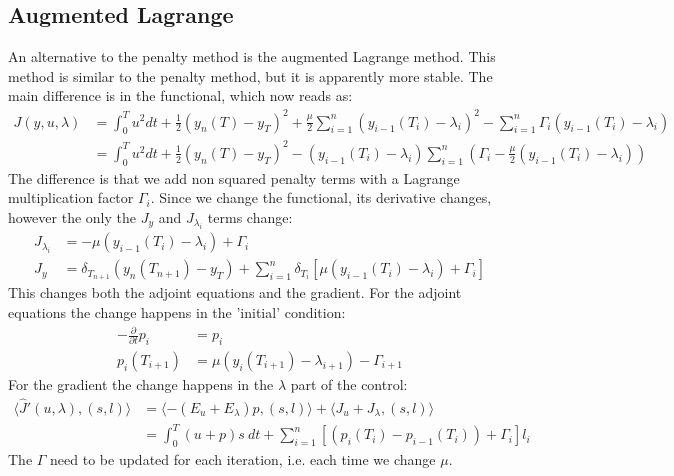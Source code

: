 \documentclass[11pt,a4paper]{article}
\begin{document}
\subsection{Augmented Lagrange}
An alternative to the penalty method is the augmented Lagrange method. This method is similar to the penalty method, but it is apparently more stable. The main difference is in the functional, which now reads as:
\begin{align*}
J(y,u,\lambda) &= \int_0^T u^2 dt + \frac{1}{2}(y_n(T)-y_T)^2 + \frac{\mu}{2} \sum_{i=1}^n (y_{i-1}(T_i)-\lambda_i)^2 - \sum_{i=1}^n \Gamma_i(y_{i-1}(T_i)-\lambda_i) \\
&= \int_0^T u^2 dt + \frac{1}{2}(y_n(T)-y_T)^2 -  (y_{i-1}(T_i)-\lambda_i)\sum_{i=1}^n (\Gamma_i-\frac{\mu}{2}(y_{i-1}(T_i)-\lambda_i))
\end{align*}
The difference is that we add non squared penalty terms with a Lagrange multiplication factor $\Gamma_i$. Since we change the functional, its derivative changes, however the only the $J_y$ and $J_{\lambda_i}$ terms change:
\begin{align*}
J_{\lambda_i}&= -\mu(y_{i-1}(T_i)-\lambda_i) +\Gamma_i\\
J_y &= \delta_{T_{n+1}}(y_n(T_{n+1})-y_T) +  \sum_{i=1}^n \delta_{T_{i}}[\mu(y_{i-1}(T_i)-\lambda_i ) + \Gamma_i]
\end{align*}
This changes both the adjoint equations and the gradient. For the adjoint equations the change happens in the 'initial' condition:
\begin{align*}
-\frac{\partial }{\partial t}p_i &=p_i  \\
p_i(T_{i+1}) &= \mu(y_{i}(T_{i+1})-\lambda_{i+1} ) - \Gamma_{i+1}
\end{align*}
For the gradient the change happens in the $\lambda$ part of the control:
\begin{align*}
\langle \hat{J}'(u,\lambda), (s,l)\rangle&=\langle -(E_u+E_{\lambda})p, (s,l)\rangle + \langle J_u+J_{\lambda}, (s,l)\rangle \\
&= \int_0^T (u+p)s \ dt +\sum_{i=1}^n[(p_{i}(T_i) -p_{i-1}(T_i) )+ \Gamma_i]l_i
\end{align*}
The $\Gamma$ need to be updated for each iteration, i.e. each time we change $\mu$.
\newpage
\end{document}

